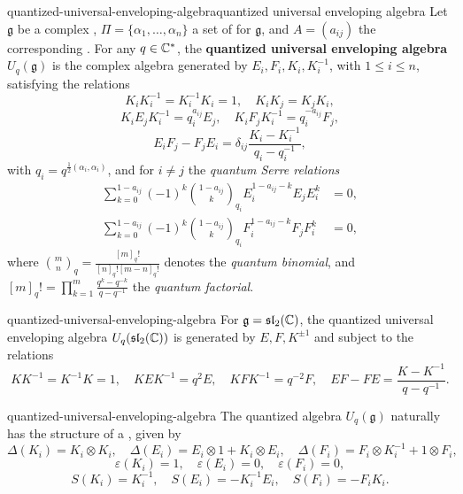 \begin{topic}{quantized-universal-enveloping-algebra}{quantized universal enveloping algebra}
    Let $\mathfrak{g}$ be a complex , $\Pi = \{ \alpha_1, \ldots, \alpha_n \}$ a set of  for $\mathfrak{g}$, and $A = (a_{ij})$ the corresponding . For any $q \in \mathbb{C}^*$, the \textbf{quantized universal enveloping algebra} $U_q(\mathfrak{g})$ is the complex algebra generated by $E_i, F_i, K_i, K_i^{-1}$, with $1 \le i \le n$, satisfying the relations
    \[ K_i K_i^{-1} = K_i^{-1} K_i = 1, \quad K_i K_j = K_j K_i , \]
    \[ K_i E_j K_i^{-1} = q_{i}^{a_{i j}} E_j, \quad K_i F_j K_i^{-1} = q_{i}^{-a_{i j}} F_j , \]
    \[ E_i F_j - F_j E_i = \delta_{i j} \frac{K_i - K_i^{-1}}{q_i - q_i^{-1}} , \]
    with $q_i = q^{\frac{1}{2} (\alpha_i, \alpha_i)}$, and for $i \ne j$ the \textit{quantum Serre relations}
    \[ \begin{aligned}
        \sum_{k = 0}^{1 - a_{i j}} (-1)^k \binom{1 - a_{i j}}{k}_{q_i} E_i^{1 - a_{i j} - k} E_j E_i^k &= 0 , \\
        \sum_{k = 0}^{1 - a_{i j}} (-1)^k \binom{1 - a_{i j}}{k}_{q_i} F_i^{1 - a_{i j} - k} F_j F_i^k &= 0 ,
    \end{aligned} \]
    where $\binom{m}{n}_q = \frac{[m]_q!}{[n]_q! [m - n]_q!}$ denotes the \textit{quantum binomial}, and $[m]_q! = \prod_{k = 1}^{m} \frac{q^k - q^{-k}}{q - q^{-1}}$ the \textit{quantum factorial}.
\end{topic}

\begin{example}{quantized-universal-enveloping-algebra}
    For $\mathfrak{g} = \mathfrak{sl}_2(\mathbb{C})$, the quantized universal enveloping algebra $U_q(\mathfrak{sl}_2(\mathbb{C}))$ is generated by $E, F, K^{\pm 1}$ and subject to the relations
    \[ KK^{-1} = K^{-1} K = 1, \quad KEK^{-1} = q^2 E, \quad KFK^{-1} = q^{-2} F, \quad EF - FE = \frac{K - K^{-1}}{q - q^{-1}} . \]
\end{example}

\begin{example}{quantized-universal-enveloping-algebra}
    The quantized algebra $U_q(\mathfrak{g})$ naturally has the structure of a , given by
    \[ \Delta(K_i) = K_i \otimes K_i, \quad \Delta(E_i) = E_i \otimes 1 + K_i \otimes E_i, \quad \Delta(F_i) = F_i \otimes K_i^{-1} + 1 \otimes F_i , \]
    \[ \varepsilon(K_i) = 1, \quad \varepsilon(E_i) = 0, \quad \varepsilon(F_i) = 0 , \]
    \[ S(K_i) = K_i^{-1}, \quad S(E_i) = -K_i^{-1} E_i, \quad S(F_i) = - F_i K_i . \]
\end{example}

